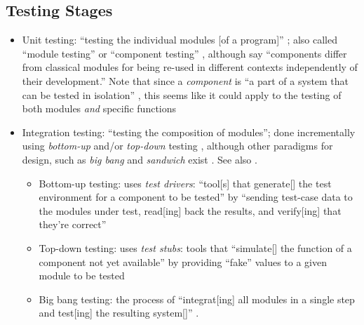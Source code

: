 \subsection{Testing Stages}
\begin{itemize}
      \item Unit testing: ``testing the individual modules [of a program]''
            \citep[p.~438]{vanVliet2000}; also called ``module testing''
            \citep[p.~109]{Patton2006} or ``component testing''
            \citep[p.~444]{PetersAndPedrycz2000}, although
            \citet[p.~107]{BaresiAndPezzè2006} say ``components differ from
            classical modules for being re-used in different contexts
            independently of their development.'' Note that since a
            \emph{component} is ``a part of a system that can be tested in
            isolation'' , this seems like it could apply
            to the testing of both modules \emph{and} specific functions
      \item Integration testing: ``testing the composition of modules'';
            done incrementally using \emph{bottom-up} and/or
            \emph{top-down} testing \citep[pp.~438-439]{vanVliet2000},
            although other paradigms for design, such as \emph{big bang} and
            \emph{sandwich} exist \citep[p.~489]{PetersAndPedrycz2000}.
            See also \citep[p.~109]{Patton2006}.
            \begin{itemize}
                  \item Bottom-up testing: uses \emph{test drivers}: ``tool[s]
                        that generate[] the test environment for a component to
                        be tested'' \citep[p.~410]{vanVliet2000} by
                        ``sending test-case data to the modules under test,
                        read[ing] back the results, and verify[ing] that
                        they're correct'' \citep[p.~109]{Patton2006}
                  \item Top-down testing: uses \emph{test stubs}: tools that
                        ``simulate[] the function of a component not yet
                        available'' \citep[p.~410]{vanVliet2000} by
                        providing ``fake'' values to a given module to be
                        tested \citep[p.~110]{Patton2006}
                  \item Big bang testing: the process of ``integrat[ing] all
                        modules in a single step and test[ing] the resulting
                        system[]'' \citep[p.~489]{PetersAndPedrycz2000}.

\end{itemize}
\end{itemize}
